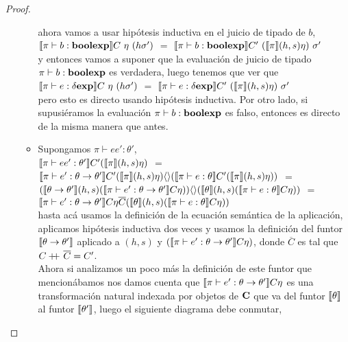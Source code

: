 \begin{proof}
\begin{itemize}
\begin{itemize}
ahora vamos a usar hip\'otesis inductiva en el juicio de tipado de $b$,\\

$\semBrcks{ \pi \vdash b : \boolexp}C \ \eta \ (h\sigma')$ $=$
$\semBrcks{ \pi \vdash b : \boolexp}C' \ (\semBrcks{\pi}(h,s)\eta) \ \sigma'$\\

y entonces vamos a suponer que la evaluaci\'on de juicio de tipado
$\pi \vdash b : \textbf{boolexp}$ es verdadera, luego tenemos que ver que\\

$\llbracket  \pi \vdash e : \delta \textbf{exp} \rrbracket C \ \eta \ (h\sigma')$ $=$ 
$\semBrcks{ \pi \vdash e : \deltaexp}C' \ (\semBrcks{\pi}(h,s)\eta) \ \sigma'$\\

pero esto es directo usando hip\'otesis inductiva. Por otro lado, si supusi\'eramos
la evaluaci\'on $\pi \vdash b : \textbf{boolexp}$ es falso, entonces es directo de la misma
manera que antes.

\item Supongamos $\pi \vdash ee' : \theta'$, \\

$\llbracket \pi \vdash ee' : \theta' \rrbracket C'(\llbracket \pi \rrbracket(h,s)\eta)$ $=$\\
$\llbracket \pi \vdash e' : \theta \rightarrow \theta' \rrbracket C'
		(\llbracket \pi \rrbracket(h,s)\eta)\langle  \rangle
		(\llbracket \pi \vdash e : \theta \rrbracket C'(\llbracket \pi \rrbracket(h,s)\eta))$ $=$\\
$(\llbracket \theta \rightarrow \theta' \rrbracket(h,s)
	(\llbracket \pi \vdash e' : \theta \rightarrow \theta' \rrbracket C \eta))\langle  \rangle
	(\llbracket \theta \rrbracket(h,s)(\llbracket \pi \vdash e : \theta \rrbracket C\eta))$ $=$\\
$\llbracket \pi \vdash e' : \theta \rightarrow \theta' \rrbracket C \eta \overline{C}
	(\llbracket \theta \rrbracket(h,s)(\llbracket \pi \vdash e : \theta \rrbracket C\eta))$\\

hasta ac\'a usamos la definici\'on de la ecuaci\'on sem\'antica de la aplicaci\'on,
aplicamos hip\'otesis inductiva dos veces y usamos la definici\'on del funtor
$\llbracket \theta \rightarrow \theta' \rrbracket$ aplicado a $(h,s)$ y 
$(\llbracket \pi \vdash e' : \theta \rightarrow \theta' \rrbracket C \eta)$, donde 
$\overline{C}$ es tal que $C +\kern-1.3ex+\kern0.8ex \overline{C} = C'$.\\
Ahora si analizamos un poco m\'as la definici\'on de este funtor que mencion\'abamos
nos damos cuenta que $\llbracket \pi \vdash e' : \theta \rightarrow \theta' \rrbracket C \eta$
es una transformaci\'on natural indexada por objetos de $\textbf{C}$ que va del funtor
$\llbracket \theta \rrbracket$ al funtor $\llbracket \theta' \rrbracket$, luego el siguiente diagrama
debe conmutar,


\end{itemize}
\end{itemize}
\end{proof}
